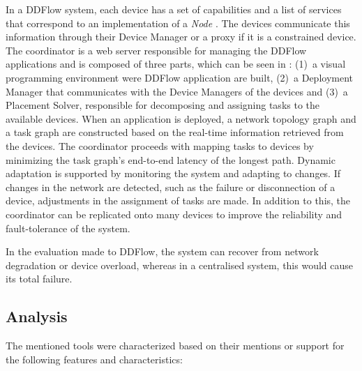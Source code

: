 In a DDFlow system, each device has a set of capabilities and a list of services that correspond to an implementation of a \textit{Node} . The devices communicate this information through their Device Manager or a proxy if it is a constrained device. The coordinator is a web server responsible for managing the DDFlow applications and is composed of three parts, which can be seen in : (1)~a visual programming environment were DDFlow application are built, (2)~a Deployment Manager that communicates with the Device Managers of the devices and (3)~a Placement Solver, responsible for decomposing and assigning tasks to the available devices. When an application is deployed, a network topology graph and a task graph are constructed based on the real-time information retrieved from the devices. The coordinator proceeds with mapping tasks to devices by minimizing the task graph's end-to-end latency of the longest path. Dynamic adaptation is supported by monitoring the system and adapting to changes. If changes in the network are detected, such as the failure or disconnection of a device, adjustments in the assignment of tasks are made. In addition to this, the coordinator can be replicated onto many devices to improve the reliability and fault-tolerance of the system.

In the evaluation made to DDFlow, the system can recover from network degradation or device overload, whereas in a centralised system, this would cause its total failure.

\subsection{Analysis}\label{sec:decentralized_sota_analysis}

The mentioned tools were characterized based on their mentions or support for the following features and characteristics:

